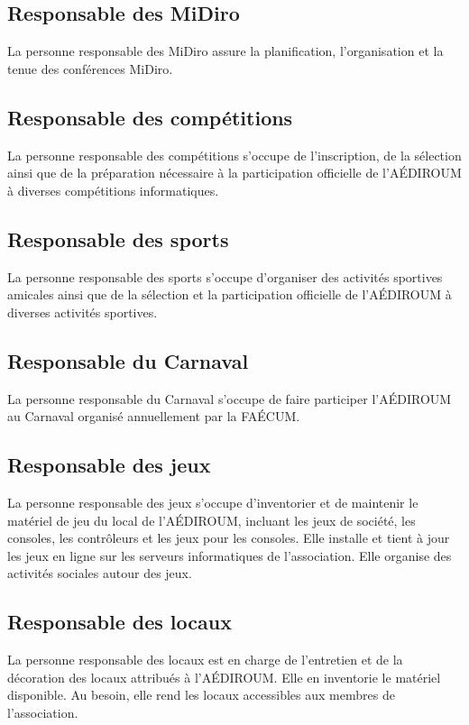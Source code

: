 \documentclass{aediroum}
\begin{document}
\subsection{Responsable des MiDiro}\label{sec:responsable-midiro}
La personne responsable des MiDiro assure la planification, l'organisation et la tenue des conférences MiDiro.

\subsection{Responsable des compétitions}\label{sec:responsable-competition}
La personne responsable des compétitions s'occupe de l'inscription, de la sélection ainsi que de la préparation nécessaire à la participation officielle de l'AÉDIROUM à diverses compétitions informatiques.

\subsection{Responsable des sports}\label{sec:responsable-sport}
La personne responsable des sports s'occupe d'organiser des activités sportives amicales ainsi que de la sélection et la participation officielle de l'AÉDIROUM à diverses activités sportives.

\subsection{Responsable du Carnaval}\label{sec:responsable-carnaval}
La personne responsable du Carnaval s'occupe de faire participer l'AÉDIROUM au Carnaval organisé annuellement par la FAÉCUM.

\subsection{Responsable des jeux}\label{sec:responsable-serveur}
La personne responsable des jeux s’occupe d’inventorier et de maintenir le matériel de
jeu du local de l’AÉDIROUM, incluant les jeux de société, les consoles, les contrôleurs et
les jeux pour les consoles. Elle installe et tient à jour les jeux en ligne sur les serveurs
informatiques de l’association. Elle organise des activités sociales autour des jeux.

\subsection{Responsable des locaux}
La personne responsable des locaux est en charge de l’entretien et de la décoration des locaux attribués à l’AÉDIROUM. Elle en inventorie le matériel disponible. Au besoin, elle rend les locaux accessibles aux membres de l’association.
\end{document}
